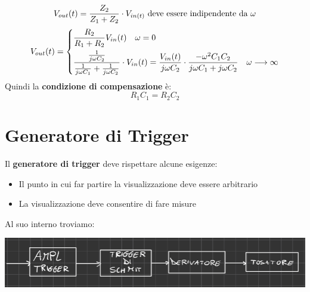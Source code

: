 \begin{equation*}
    V_{out}(t) = \frac{Z_2}{Z_1 + Z_2} \cdot V_{in (t)} \ \text{deve essere indipendente da $\omega$}
\end{equation*}
\begin{equation*}
    V_{out}(t) = \begin{dcases}
        \frac{R_2}{R_1 + R_2} V_{in}(t) \quad \omega=0\\
        \frac{\frac{1}{j\omega C_2}}{\frac{1}{j\omega C_1} + \frac{1}{j\omega C_2}} \cdot V_{in}(t) = \frac{ V_{in}(t)}{j\omega C_2} \cdot \frac{-\omega^2 C_1 C_2}{j\omega C_1 + j\omega C_2} \quad \omega \longrightarrow \infty
    \end{dcases}
\end{equation*}
Quindi la \textbf{condizione di compensazione} è:
\begin{equation*}
    R_1 C_1 = R_2 C_2
\end{equation*}
\section{Generatore di Trigger}
Il \textbf{generatore di trigger} deve rispettare alcune esigenze:
\begin{itemize}
    \item Il punto in cui far partire la visualizzazione deve essere arbitrario
    \item La visualizzazione deve consentire di fare misure
\end{itemize}
Al suo interno troviamo:
\begin{center}
    \includegraphics[width=.6\textwidth]{Images/figure18.png}
\end{center}
